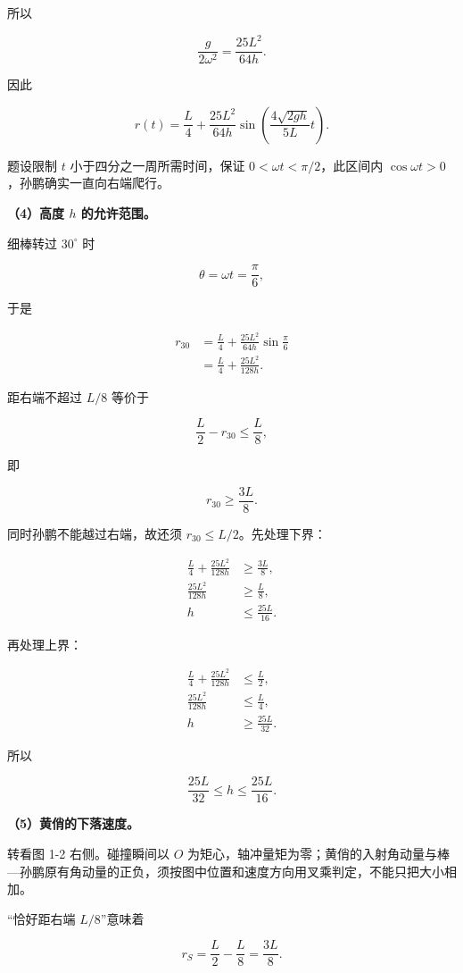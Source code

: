 \documentclass[12pt,a4paper,UTF8]{ctexart}
\begin{document}
所以

\[\frac{g}{2\omega^2}=\frac{25L^2}{64h}.\]

因此

\[
\boxed{r(t)=\frac L4+\frac{25L^2}{64h}
\sin\left(\frac{4\sqrt{2gh}}{5L}t\right)}.
\]

题设限制 \(t\) 小于四分之一周所需时间，保证
\(0<\omega t<\pi/2\)，此区间内
\(\cos\omega t>0\)，孙鹏确实一直向右端爬行。

\textbf{（4）高度 \(h\) 的允许范围。}

细棒转过 \(30^\circ\) 时

\[\theta=\omega t=\frac\pi6,\]

于是

\[
\begin{aligned}
r_{30}
&=\frac L4+\frac{25L^2}{64h}\sin\frac\pi6\\
&=\frac L4+\frac{25L^2}{128h}.
\end{aligned}
\]

距右端不超过 \(L/8\) 等价于

\[\frac L2-r_{30}\le\frac L8,\]

即

\[r_{30}\ge\frac{3L}{8}.\]

同时孙鹏不能越过右端，故还须 \(r_{30}\le L/2\)。先处理下界：

\[
\begin{aligned}
\frac L4+\frac{25L^2}{128h}&\ge\frac{3L}{8},\\
\frac{25L^2}{128h}&\ge\frac L8,\\
h&\le\frac{25L}{16}.
\end{aligned}
\]

再处理上界：

\[
\begin{aligned}
\frac L4+\frac{25L^2}{128h}&\le\frac L2,\\
\frac{25L^2}{128h}&\le\frac L4,\\
h&\ge\frac{25L}{32}.
\end{aligned}
\]

所以

\[\boxed{\frac{25L}{32}\le h\le\frac{25L}{16}}.\]

\textbf{（5）黄俏的下落速度。}

转看图 1-2 右侧。碰撞瞬间以 \(O\)
为矩心，轴冲量矩为零；黄俏的入射角动量与棒---孙鹏原有角动量的正负，须按图中位置和速度方向用叉乘判定，不能只把大小相加。

``恰好距右端 \(L/8\)''意味着

\[r_S=\frac L2-\frac L8=\frac{3L}{8}.\]
\end{document}
